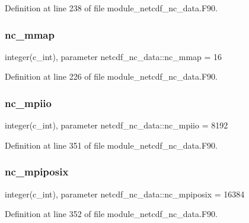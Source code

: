 Definition at line 238 of file module\+\_\+netcdf\+\_\+nc\+\_\+data.\+F90.

\mbox{\label{namespacenetcdf__nc__data_acd96905f0345296902806ac08859f757}} 
\subsubsection{\texorpdfstring{nc\+\_\+mmap}{nc\_mmap}}
{\footnotesize\ttfamily integer(c\+\_\+int), parameter netcdf\+\_\+nc\+\_\+data\+::nc\+\_\+mmap = 16}



Definition at line 226 of file module\+\_\+netcdf\+\_\+nc\+\_\+data.\+F90.

\mbox{\label{namespacenetcdf__nc__data_a24a00c693d9f358d39ea74ed945a8add}} 
\subsubsection{\texorpdfstring{nc\+\_\+mpiio}{nc\_mpiio}}
{\footnotesize\ttfamily integer(c\+\_\+int), parameter netcdf\+\_\+nc\+\_\+data\+::nc\+\_\+mpiio = 8192}



Definition at line 351 of file module\+\_\+netcdf\+\_\+nc\+\_\+data.\+F90.

\mbox{\label{namespacenetcdf__nc__data_ab68ea6219956d7c6855e01ac6587f91f}} 
\subsubsection{\texorpdfstring{nc\+\_\+mpiposix}{nc\_mpiposix}}
{\footnotesize\ttfamily integer(c\+\_\+int), parameter netcdf\+\_\+nc\+\_\+data\+::nc\+\_\+mpiposix = 16384}



Definition at line 352 of file module\+\_\+netcdf\+\_\+nc\+\_\+data.\+F90.

